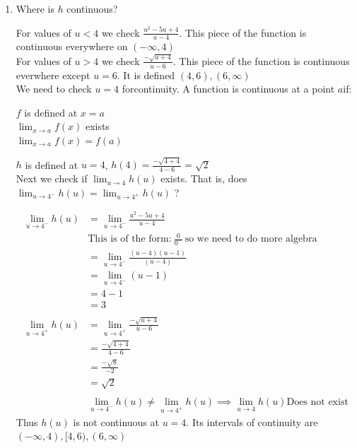 \documentclass[nooutcomes, handout]{ximera}
\begin{document}
\begin{problem}
\begin{enumerate}
\begin{freeResponse}
	\end{freeResponse}

	\item Where is $h$ continuous?

	\begin{freeResponse}
		For values of $u<4$ we check $\frac{u^2-5u+4}{u - 4}$.  This piece of the function is continuous everywhere on $(-\infty,4)$ \\
	For values of $u>4$ we check $\frac{-\sqrt{u+4}}{u - 6}$. This piece of the function is continuous everwhere except $u=6$.  It is defined $(4,6),(6,\infty)$\\

	We need to check $u=4$ forcontinuity. A function is continuous at a point $a$if:
	\begin{center}
	  $f$ is defined at $x = a$\\

     	 $\lim_{x \to a} f(x)$ exists\\

    	  $\lim_{x \to a} f(x) = f(a)$
	\end{center}

$h$ is defined at $u=4$, $h(4)=\frac{-\sqrt{4+4}}{4 - 6}=\sqrt{2}$\\
Next we check if  $\lim_{u \to 4} h(u)$ exists.  That is, does $\lim_{u \to 4^-} h(u)=\lim_{u \to 4^+} h(u)$ ?

	\begin{align*}
	\lim_{u \to 4^-} h(u)&=\lim_{u \to 4^-}\frac{u^2-5u+4}{u - 4}\\
	& \text{This is of the form:}\ \frac{0}{0^-}\ \text{so we need to do more algebra}\\
	&=\lim_{u \to 4^-}\frac{(u-4)(u-1)}{(u-4)}\\
	&=\lim_{u \to 4^-}(u-1)\\
	&=4-1\\
	&=3 \\ \\
	\lim_{u \to 4^+} h(u)&=\lim_{u \to 4^+}\frac{-\sqrt{u+4}}{u - 6}\\
	&=\frac{-\sqrt{4+4}}{4 - 6}\\
	&=\frac{-\sqrt{8}}{-2}\\
	&=\sqrt{2}\\ \\
	&\lim_{u \to 4^-} h(u)\ne \lim_{u \to 4^+} h(u) \implies \lim_{u \to 4} h(u) \text{Does not exist}
	\end{align*}
Thus $h(u)$ is not continuous at $u=4$.    Its intervals of continuity are $(-\infty,4),[4,6),(6,\infty)$


\end{freeResponse}
\end{enumerate}
\end{problem}
\end{document}
